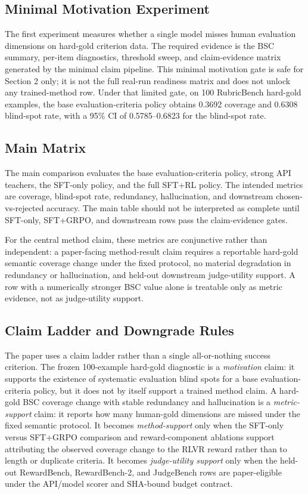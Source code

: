 \subsection{Minimal Motivation Experiment}

The first experiment measures whether a single model misses human evaluation
dimensions on hard-gold criterion data. The required evidence is the BSC summary,
per-item diagnostics, threshold sweep, and claim-evidence matrix generated by
the minimal claim pipeline. This minimal motivation gate is safe for Section 2
only; it is not the full real-run readiness matrix and does not unlock any
trained-method row. Under that limited gate, on 100 RubricBench hard-gold
examples, the base evaluation-criteria policy obtains 0.3692 coverage and
0.6308 blind-spot rate, with a 95\% CI of 0.5785--0.6823 for the blind-spot
rate.

\subsection{Main Matrix}

The main comparison evaluates the base evaluation-criteria policy, strong API
teachers, the SFT-only policy, and the full SFT+RL policy. The intended metrics
are coverage, blind-spot rate, redundancy, hallucination, and downstream
chosen-vs-rejected accuracy. The main table should not be interpreted as
complete until SFT-only, SFT+GRPO, and downstream rows pass the claim-evidence
gates.

For the central method claim, these metrics are conjunctive rather than
independent: a paper-facing method-result claim requires a reportable hard-gold
semantic coverage change under the fixed protocol, no material degradation in redundancy or
hallucination, and held-out downstream judge-utility support. A row with a
numerically stronger BSC value alone is treatable only as metric evidence, not
as judge-utility support.

\subsection{Claim Ladder and Downgrade Rules}

The paper uses a claim ladder rather than a single all-or-nothing success
criterion. The frozen 100-example hard-gold diagnostic is a \emph{motivation}
claim: it supports the existence of systematic evaluation blind spots for a
base evaluation-criteria policy, but it does not by itself support a trained
method claim. A hard-gold BSC coverage change with stable redundancy and
hallucination is a \emph{metric-support} claim: it reports how many
human-gold dimensions are missed under the fixed semantic protocol. It becomes \emph{method-support}
only when the SFT-only versus SFT+GRPO comparison and reward-component
ablations support attributing the observed coverage change to the RLVR reward
rather than to length or duplicate criteria. It becomes \emph{judge-utility support} only
when the held-out RewardBench, RewardBench-2, and JudgeBench rows are
paper-eligible under the API/model scorer and SHA-bound budget contract.

